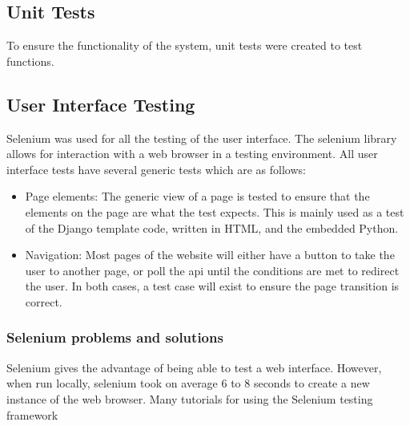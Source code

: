 \subsection{Unit Tests}
To ensure the functionality of the system, unit tests were created to test functions. 
\begin{figure}[h!]
\end{figure}

\subsection{User Interface Testing}
Selenium was used for all the testing of the user interface. The selenium library allows for interaction with a web browser in a testing environment. All user interface tests have several generic tests which are as follows:
\begin{itemize}
	\item Page elements: The generic view of a page is tested to ensure that the elements on the page are what the test expects. This is mainly used as a test of the Django template code, written in HTML, and the embedded Python.
	\item Navigation: Most pages of the website will either have a button to take the user to another page, or poll the api until the conditions are met to redirect the user. In both cases, a test case will exist to ensure the page transition is correct. 
\end{itemize}

\subsubsection{Selenium problems and solutions}
Selenium gives the advantage of being able to test a web interface. However, when run locally, selenium took on average 6 to 8 seconds to create a new instance of the web browser. Many tutorials for using the Selenium testing framework 


